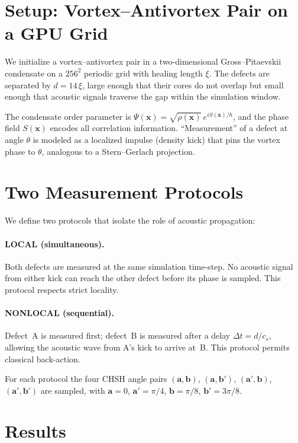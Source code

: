 \documentclass[reprint,amsmath,amssymb,aps,prl,superscriptaddress]{revtex4-2}
\begin{document}
\section{Setup: Vortex--Antivortex Pair on a GPU Grid}
\label{sec:setup}

We initialize a vortex--antivortex pair in a two-dimensional
Gross--Pitaevskii condensate on a $256^{2}$ periodic grid with
healing length $\xi$.  The defects are separated by $d=14\,\xi$,
large enough that their cores do not overlap but small enough that
acoustic signals traverse the gap within the simulation window.

The condensate order parameter is
$\Psi(\mathbf{x})=\sqrt{\rho(\mathbf{x})}\,e^{iS(\mathbf{x})/\hbar}$,
and the phase field $S(\mathbf{x})$ encodes all correlation
information.  ``Measurement'' of a defect at angle $\theta$ is
modeled as a localized impulse (density kick) that pins the vortex
phase to $\theta$, analogous to a Stern--Gerlach projection.

\section{Two Measurement Protocols}
\label{sec:protocols}

We define two protocols that isolate the role of acoustic propagation:

\paragraph{LOCAL (simultaneous).}
Both defects are measured at the same simulation time-step.
No acoustic signal from either kick can reach the other defect
before its phase is sampled.  This protocol respects strict
locality.

\paragraph{NONLOCAL (sequential).}
Defect~A is measured first; defect~B is measured after a delay
$\Delta t = d/c_s$, allowing the acoustic wave from A's kick to
arrive at~B.  This protocol permits classical back-action.

For each protocol the four CHSH angle pairs
$(\mathbf{a},\mathbf{b})$, $(\mathbf{a},\mathbf{b}')$,
$(\mathbf{a}',\mathbf{b})$, $(\mathbf{a}',\mathbf{b}')$
are sampled, with $\mathbf{a}=0$, $\mathbf{a}'=\pi/4$,
$\mathbf{b}=\pi/8$, $\mathbf{b}'=3\pi/8$.

\section{Results}
\label{sec:results}
\end{document}
